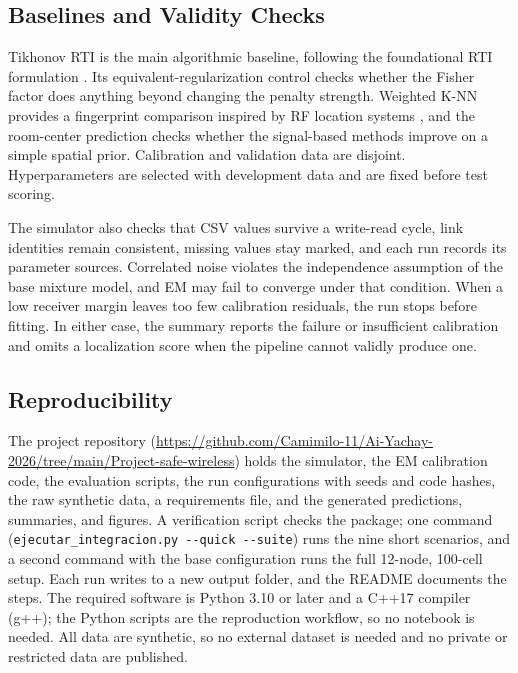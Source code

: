 \documentclass[sensors,article,submit,oneauthor]{Definitions/mdpi}
\begin{document}
\subsection{Baselines and Validity Checks}

Tikhonov RTI is the main algorithmic baseline, following the foundational RTI formulation \cite{Wilson2010}. Its equivalent-regularization control checks whether the Fisher factor does anything beyond changing the penalty strength. Weighted K-NN provides a fingerprint comparison inspired by RF location systems \cite{Bahl2000}, and the room-center prediction checks whether the signal-based methods improve on a simple spatial prior. Calibration and validation data are disjoint. Hyperparameters are selected with development data and are fixed before test scoring.

The simulator also checks that CSV values survive a write-read cycle, link identities remain consistent, missing values stay marked, and each run records its parameter sources. Correlated noise violates the independence assumption of the base mixture model, and EM may fail to converge under that condition. When a low receiver margin leaves too few calibration residuals, the run stops before fitting. In either case, the summary reports the failure or insufficient calibration and omits a localization score when the pipeline cannot validly produce one.

\subsection{Reproducibility}

The project repository (\url{https://github.com/Camimilo-11/Ai-Yachay-2026/tree/main/Project-safe-wireless}) holds the simulator, the EM calibration code, the evaluation scripts, the run configurations with seeds and code hashes, the raw synthetic data, a requirements file, and the generated predictions, summaries, and figures. A verification script checks the package; one command (\texttt{ejecutar\_integracion.py -{}-quick -{}-suite}) runs the nine short scenarios, and a second command with the base configuration runs the full 12-node, 100-cell setup. Each run writes to a new output folder, and the README documents the steps. The required software is Python 3.10 or later and a C++17 compiler (g++); the Python scripts are the reproduction workflow, so no notebook is needed. All data are synthetic, so no external dataset is needed and no private or restricted data are published.
\end{document}
